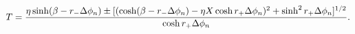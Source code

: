 \begin{equation} \label{eksing}
T =  {  \eta \sinh(\beta - r_- \Delta \phi_n) \pm [( \cosh (\beta - r_-
\Delta \phi_n) - \eta X \cosh r_+ \Delta \phi_n)^2 + \sinh^2
r_+ \Delta \phi_n]^{1/2}
\over    \cosh r_+ \Delta \phi_n}.
\end{equation}

